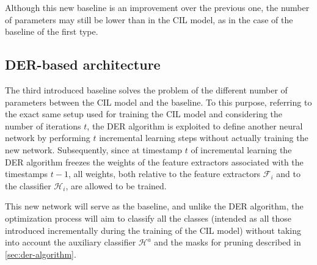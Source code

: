 Although this new baseline is an improvement over the previous one, the number of parameters may still be lower than in the CIL model, as in the case of the baseline of the first type.

\subsection{DER-based architecture}
\label{sec:method-baseline3}
The third introduced baseline solves the problem of the different number of parameters between the CIL model and the baseline.
To this purpose, referring to the exact same setup used for training the CIL model and considering the number of iterations $t$, the DER algorithm is exploited to define another neural network by performing $t$ incremental learning steps without actually training the new network.
Subsequently, since at timestamp $t$ of incremental learning the DER algorithm freezes the weights of the feature extractors associated with the timestamps $t-1$, all weights, both relative to the feature extractors $\mathcal{F}_i$ and to the classifier $\mathcal{H}_{i}$, are allowed to be trained.

This new network will serve as the baseline, and unlike the DER algorithm, the optimization process will aim to classify all the classes (intended as all those introduced incrementally during the training of the CIL model) without taking into account the auxiliary classifier $\mathcal{H}^a$ and the masks for pruning described in \autoref{sec:der-algorithm}.